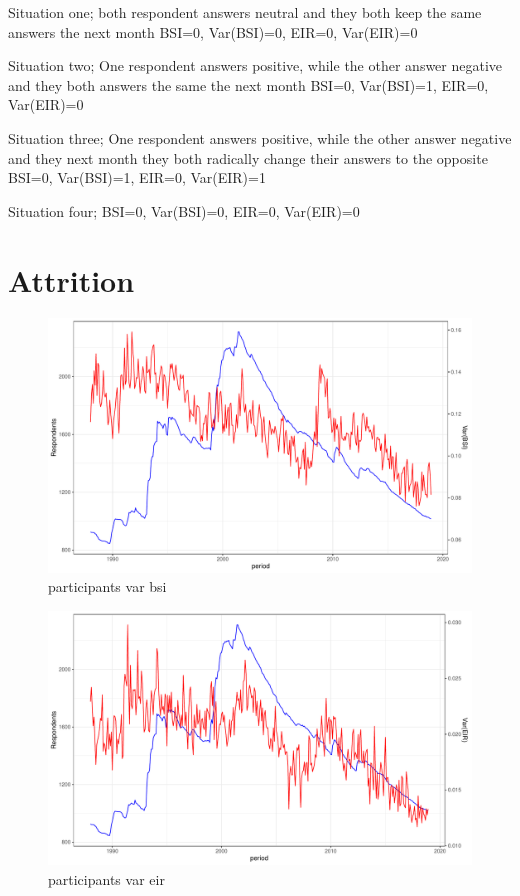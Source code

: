 \documentclass[12pt,a4paper,oneside]{book}
\begin{document}
Situation one; both respondent answers neutral and they both keep the same answers the next month 
BSI=0, Var(BSI)=0, EIR=0, Var(EIR)=0

Situation two; One respondent answers positive, while the other answer negative and they both answers the same the next month
BSI=0, Var(BSI)=1, EIR=0, Var(EIR)=0


Situation three; One respondent answers positive, while the other answer negative and they next month they both radically change their answers to the opposite
BSI=0, Var(BSI)=1, EIR=0, Var(EIR)=1

Situation four;
BSI=0, Var(BSI)=0, EIR=0, Var(EIR)=0



\newpage
\section*{Attrition}

\begin{figure}[H]
    \centering
    \includegraphics[scale=0.5]{Graphs/participants_var_bsi.pdf}
    \caption{participants var bsi}
    \label{fig:participants var bsi}
\end{figure}

\begin{figure}[H]
    \centering
    \includegraphics[scale=0.5]{Graphs/participants_var_eir.pdf}
    \caption{participants var eir}
    \label{fig:participants var eir}
\end{figure}
\end{document}

